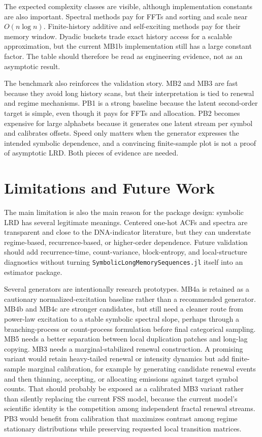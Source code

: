 \documentclass[journal]{IEEEtran}
\newcommand{\pkg}[1]{\texttt{#1}}
\newcommand{\sfive}{\pkg{SymbolicLongMemorySequences.jl}}
\begin{document}
The expected complexity classes are visible, although implementation constants
are also important.
Spectral methods pay for FFTs and sorting and scale near $O(n\log n)$.
Finite-history additive and self-exciting methods pay for their memory window.
Dyadic buckets trade exact history access for a scalable approximation, but the
current MB1b implementation still has a large constant factor.  The table
should therefore be read as engineering evidence, not as an asymptotic result.

The benchmark also reinforces the validation story.  MB2 and MB3 are fast
because they avoid long history scans, but their interpretation is tied to
renewal and regime mechanisms.  PB1 is a strong baseline because the latent
second-order target is simple, even though it pays for FFTs and allocation.  PB2
becomes expensive for large alphabets because it generates one latent stream per
symbol and calibrates offsets.  Speed only matters when the generator expresses
the intended symbolic dependence, and a convincing finite-sample plot is not a
proof of asymptotic LRD.
Both pieces of evidence are needed.


\section{Limitations and Future Work}

The main limitation is also the main reason for the package design: symbolic LRD
has several legitimate meanings.  Centered one-hot ACFs and spectra are transparent and
close to the DNA-indicator literature, but they can understate regime-based,
recurrence-based, or higher-order dependence.  Future validation should add
recurrence-time, count-variance, block-entropy, and local-structure diagnostics
without turning \sfive{} itself into an estimator package.

Several generators are intentionally research prototypes.  MB4a is retained as
a cautionary normalized-excitation baseline rather than a recommended generator.
MB4b and MB4c are stronger candidates, but still need a cleaner route from
power-law excitation to a stable symbolic spectral slope, perhaps through a
branching-process or count-process formulation before final categorical
sampling.  MB5 needs a better separation between local duplication patches and
long-lag copying.  MB3 needs a marginal-stabilized renewal construction.  A
promising variant would retain heavy-tailed renewal or intensity dynamics but
add finite-sample marginal calibration, for example by generating candidate
renewal events and then thinning, accepting, or allocating emissions against
target symbol counts.  That should probably be exposed as a calibrated MB3
variant rather than silently replacing the current FSS model, because the
current model's scientific identity is the competition among independent
fractal renewal streams.  PB3 would benefit from calibration that maximizes
contrast among regime stationary distributions while preserving requested local
transition matrices.
\end{document}
